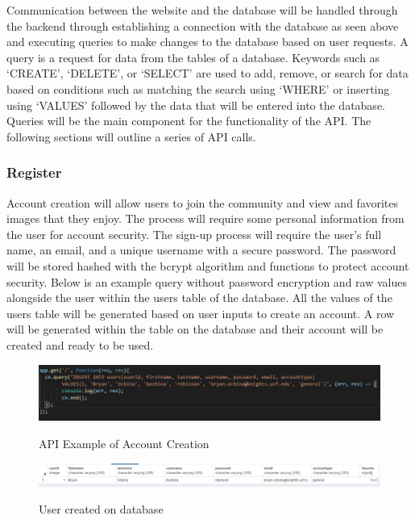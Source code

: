 \documentclass[12pt]{report}
\begin{document}
Communication between the website and the database will be handled through the backend through establishing a connection with the database as seen above and executing queries to make changes to the database based on user requests.  A query is a request for data from the tables of a database.  Keywords such as ‘CREATE’, ‘DELETE’, or ‘SELECT’ are used to add, remove, or search for data based on conditions such as matching the search using ‘WHERE’ or inserting using ‘VALUES’ followed by the data that will be entered into the database.  Queries will be the main component for the functionality of the API.  The following sections will outline a series of API calls.

\subsubsection*{Register}

Account creation will allow users to join the community and view and favorites images that they enjoy.  The process will require some personal information from the user for account security.  The sign-up process will require the user’s full name, an email, and a unique username with a secure password.  The password will be stored hashed with the bcrypt algorithm and functions to protect account security.  Below is an example query without password encryption and raw values alongside the user within the users table of the database.  All the values of the users table will be generated based on user inputs to create an account.  A row will be generated within the table on the database and their account will be created and ready to be used. 

\begin{figure}[h]
	\centering
	\caption{API Example of Account Creation}
	\includegraphics[width=\linewidth]{api_raw_register}
	\label{fig:API Register}
\end{figure}

\begin{figure}[h]
	\centering
	\caption{User created on database}
	\includegraphics[width=\linewidth]{database_user}
	\label{fig:Database User}
\end{figure}
\end{document}
